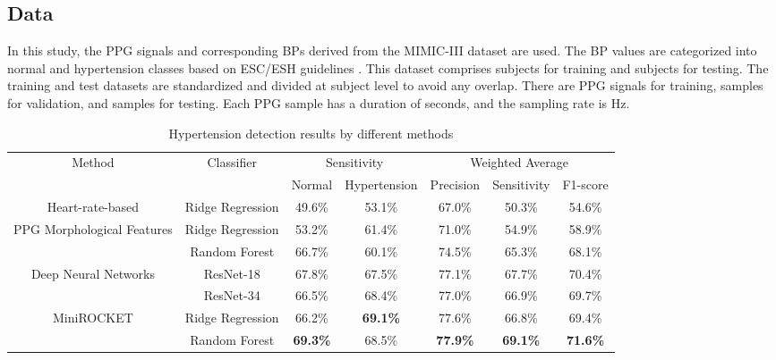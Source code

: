 \documentclass[letterpaper, 10 pt, conference]{ieeeconf}
\begin{document}
\subsection{Data}

In this study, the PPG signals and corresponding BPs derived from the MIMIC-III dataset \cite{schrumpf2021assessment} are used. The BP values are categorized into normal and hypertension classes based on ESC/ESH guidelines \cite{mancia20142013}. This dataset comprises  subjects for training and  subjects for testing. The training and test datasets are standardized and divided at subject level to avoid any overlap. There are  PPG signals for training,  samples for validation, and  samples for testing. Each PPG sample has a duration of  seconds, and the sampling rate is  Hz. 










\bgroup
\def\arraystretch{1.4}\begin{table*}[t]
\centering
	\caption{Hypertension detection results by different methods}
			\begin{adjustbox}{width=0.8\textwidth}

	\begin{tabular}{c|c|cc|ccc}		
      \hline

		\hline
		\multirow{2}{*}{Method} &
		\multirow{2}{*}{Classifier} &		
		\multicolumn{2}{c|}{Sensitivity} &	\multicolumn{3}{c}{Weighted Average} \\
		& & Normal & Hypertension & Precision & Sensitivity & F1-score \\
		\hline
  		\multirow{1}{*}{Heart-rate-based} & Ridge Regression & 49.6\% & 53.1\% & 67.0\% & 50.3\% & 54.6\% \\
    \hline
		\multirow{2}{*}{PPG Morphological Features} & Ridge Regression & 53.2\% & 61.4\% & 71.0\% & 54.9\% & 58.9\% \\
		\cline{2-7}
		& Random Forest & 66.7\% & 60.1\% & 74.5\% & 65.3\% & 68.1\% \\	
		\hline
		\multirow{2}{*}{Deep Neural Networks} & ResNet-18 & 67.8\% & 67.5\% & 77.1\% & 67.7\% & 70.4\% \\
		\cline{2-7}
		& ResNet-34 & 66.5\% & 68.4\% & 77.0\% & 66.9\% & 69.7\% \\
	
  \hline
		\multirow{2}{*}{MiniROCKET} & Ridge Regression & 66.2\% & \textbf{69.1\%} & 77.6\% & 66.8\% & 69.4\% \\
\cline{2-7}
		& Random Forest & \textbf{69.3\%} & 68.5\% & \textbf{77.9\%} & \textbf{69.1\%} & \textbf{71.6\%} \\
\hline
	\end{tabular}
		\end{adjustbox}
\label{table:results}
\vspace{-2mm}
\end{table*}
\egroup
\end{document}
